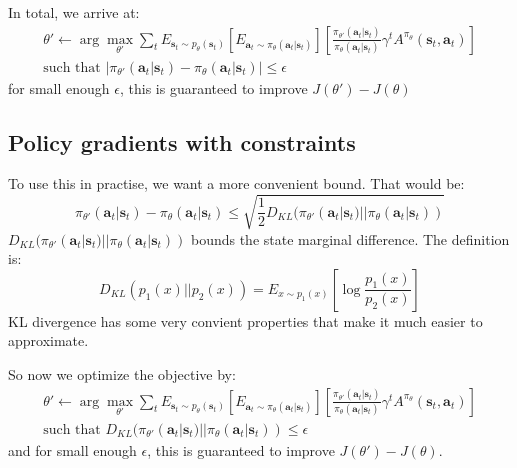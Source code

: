 \documentclass{report}
\newcommand{\argmax}{\arg\!\max}
\begin{document}
In total, we arrive at:
\begin{gather}
		\theta' \leftarrow
		\argmax_{\theta'} \sum_{t}^{} E_{ \bm{s}_{t}\sim p_{ \theta } (\bm{s}_{t}) }
		\left[ E_{ \bm{a}_{t}\sim \pi_{ \theta } (\bm{a}_{t}| \bm{s}_{t} ) } \right]
		\left[ \frac{\pi_{ \theta' }(\bm{a}_{t}| \bm{s}_{t} )}{\pi_{ \theta }(\bm{a}_{t}| \bm{s}_{t} )} 
		\gamma^{ t } A^{ \pi_{ \theta } } (\bm{s}_{t}, \bm{a}_{t} )\right]  \\
		\text{such that } \left| \pi_{ \theta' } (\bm{a}_{t}| \bm{s}_{t} ) - \pi_{ \theta } (\bm{a}_{t}| \bm{s}_{t} ) \right| \leq \epsilon 
\end{gather}
for small enough $ \epsilon  $, this is guaranteed to improve $ J (\theta') - J (\theta)  $

\subsection{Policy gradients with constraints}
To use this in practise, we want a more convenient bound.
That would be:
\begin{equation}
		\pi_{ \theta' } (\bm{a}_{t}| \bm{s}_{t} ) - \pi_{ \theta } (\bm{a}_{t}| \bm{s}_{t} ) \leq
		\sqrt{\frac{1}{2} D_{ KL } (\pi_{ \theta' }(\bm{a}_{t}| \bm{s}_{t} )||\pi_{ \theta }(\bm{a}_{t}| \bm{s}_{t} ))}
\end{equation}
$  D_{ KL } (\pi_{ \theta' }(\bm{a}_{t}| \bm{s}_{t} )||\pi_{ \theta }(\bm{a}_{t}| \bm{s}_{t} )) $ bounds
the state marginal difference.
The definition is:
\begin{equation}
		D_{ KL } (p_{ 1 }(x) || p_{ 2 } (x)) 
		= E_{ x \sim p_{ 1 }(x) } \left[ \log \frac{p_{ 1 } (x)}{p_{ 2 } ( x)}  \right] 
\end{equation}
KL divergence has some very convient properties that make it much easier to approximate.

So now we optimize the objective by:
\begin{gather}
		\theta' \leftarrow
		\argmax_{\theta'} \sum_{t}^{} E_{ \bm{s}_{t}\sim p_{ \theta } (\bm{s}_{t}) }
		\left[ E_{ \bm{a}_{t}\sim \pi_{ \theta } (\bm{a}_{t}| \bm{s}_{t} ) } \right]
		\left[ \frac{\pi_{ \theta' }(\bm{a}_{t}| \bm{s}_{t} )}{\pi_{ \theta }(\bm{a}_{t}| \bm{s}_{t} )} 
		\gamma^{ t } A^{ \pi_{ \theta } } (\bm{s}_{t}, \bm{a}_{t} )\right]  \\
		\text{such that } 
D_{ KL } (\pi_{ \theta' } (\bm{a}_{t}| \bm{s}_{t} ) || \pi_{ \theta }(\bm{a}_{t}| \bm{s}_{t} ))
		\leq \epsilon 
\end{gather}
and for small enough $ \epsilon  $, this is guaranteed to improve $ J (\theta') - J (\theta)  $.
\end{document}
